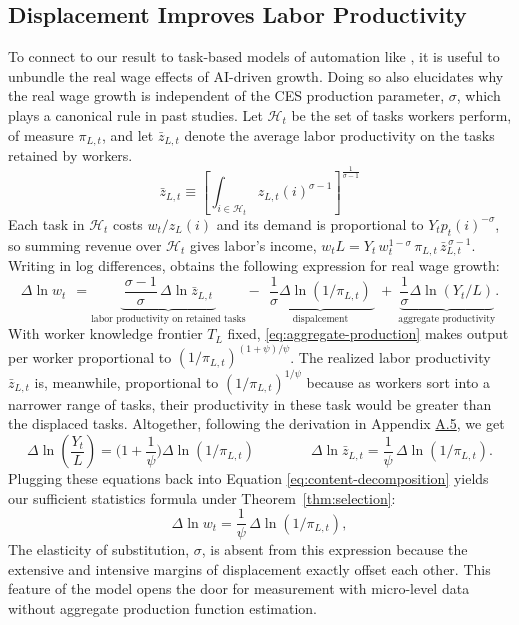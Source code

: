 \documentclass[11pt]{article}
\begin{document}
\subsection{Displacement Improves Labor Productivity}

To connect to our result to task-based models of automation like \citep{ar2018},
it is useful to unbundle the real wage effects of AI-driven growth.
Doing so also elucidates why the real wage growth is independent of
the CES production parameter, $\sigma$, which plays a canonical rule
in past studies. Let $\mathcal{H}_{t}$ be the set of tasks workers
perform, of measure $\pi_{L,t}$, and let $\bar{z}_{L,t}$ denote
the average labor productivity on the tasks retained by workers. 
\[
\bar{z}_{L,t}\equiv\left[\int_{i\in\mathcal{H}_{t}}z_{L,t}(i)^{\sigma-1}\right]^{\frac{1}{\sigma-1}}
\]
Each task in $\mathcal{H}_{t}$ costs $w_{t}/z_{L}(i)$ and its demand
is proportional to $Y_{t}p_{t}(i)^{-\sigma}$, so summing revenue
over $\mathcal{H}_{t}$ gives labor's income, $w_{t}L=Y_{t}\,w^{1-\sigma}_{t}\,\pi_{L,t}\,\bar{z}^{\,\sigma-1}_{L,t}$.
Writing in log differences, obtains the following expression for real
wage growth:
\begin{equation}
\Delta\ln w_{t}\ \ =\underbrace{\ \frac{\sigma-1}{\sigma}\,\Delta\ln\bar{z}_{L,t}\ }_{\text{labor productivity on retained tasks}}-\ \underbrace{\ \frac{1}{\sigma}\Delta\ln(1/\pi_{L,t})\ }_{\text{dispalcement}}\ +\ \underbrace{\frac{1}{\sigma}\Delta\ln(Y_{t}/L)}_{\text{aggregate productivity}}.\label{eq:content-decomposition}
\end{equation}
With worker knowledge frontier $T_{L}$ fixed, \eqref{eq:aggregate-production}
makes output per worker proportional to $(1/\pi_{L,t})^{(1+\psi)/\psi}$.
The realized labor productivity $\bar{z}_{L,t}$ is, meanwhile, proportional
to $(1/\pi_{L,t})^{1/\psi}$ because as workers sort into a narrower
range of tasks, their productivity in these task would be greater
than the displaced tasks. Altogether, following the derivation in
Appendix \href{https://ahmadlp.github.io/Lashkaripour_AI_Displacement_Online_Appendix.pdf\#page=9}{A.5}, we get 
\begin{equation}
\Delta\ln(\frac{Y_{t}}{L})=\Big(1+\frac{1}{\psi}\Big)\Delta\ln(1/\pi_{L,t})\qquad\qquad\Delta\ln\bar{z}_{L,t}=\frac{1}{\psi}\,\Delta\ln(1/\pi_{L,t}).\label{eq:productivity-effect}
\end{equation}
Plugging these equations back into Equation \eqref{eq:content-decomposition}
yields our sufficient statistics formula under Theorem~\ref{thm:selection}:
\[
\Delta\ln w_{t}=\frac{1}{\psi}\,\Delta\ln(1/\pi_{L,t}),
\]
The elasticity of substitution, $\sigma$, is absent from this expression
because the extensive and intensive margins of displacement exactly
offset each other. This feature of the model opens the door for measurement
with micro-level data without aggregate production function estimation.
\end{document}

